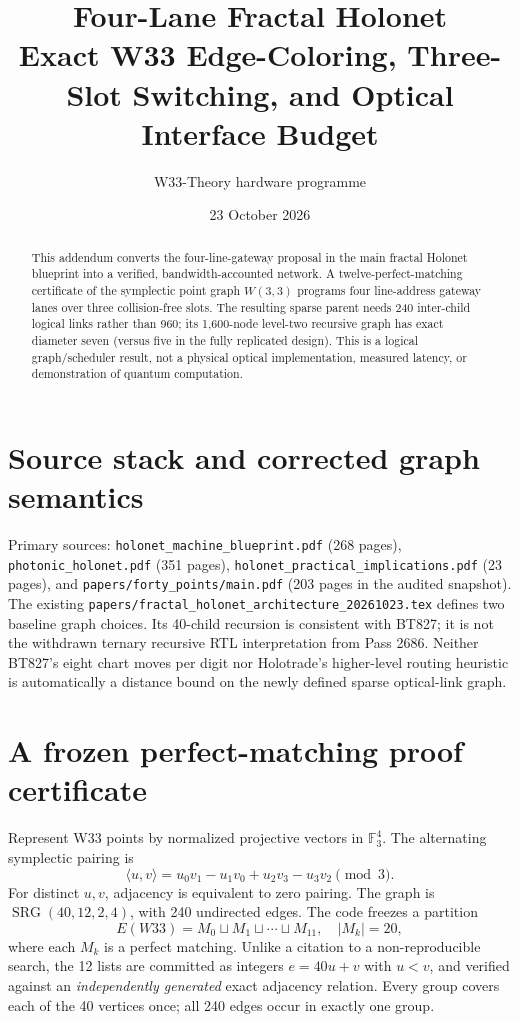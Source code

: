 \documentclass[10pt]{article}
\title{\textbf{Four-Lane Fractal Holonet}\\Exact W33 Edge-Coloring, Three-Slot Switching, and Optical Interface Budget}
\author{W33-Theory hardware programme}
\date{23 October 2026}
\begin{document}
\maketitle
\begin{abstract}
This addendum converts the four-line-gateway proposal in the main fractal Holonet blueprint into a verified, bandwidth-accounted network. A twelve-perfect-matching certificate of the symplectic point graph $W(3,3)$ programs four line-address gateway lanes over three collision-free slots. The resulting sparse parent needs 240 inter-child logical links rather than 960; its 1,600-node level-two recursive graph has exact diameter seven (versus five in the fully replicated design). This is a logical graph/scheduler result, not a physical optical implementation, measured latency, or demonstration of quantum computation.
\end{abstract}
\tableofcontents
\section{Source stack and corrected graph semantics}
Primary sources: \texttt{holonet\_machine\_blueprint.pdf} (268 pages),
\texttt{photonic\_holonet.pdf} (351 pages),
\texttt{holonet\_practical\_implications.pdf} (23 pages), and
\texttt{papers/forty\_points/main.pdf} (203 pages in the audited snapshot).
The existing \texttt{papers/fractal\_holonet\_architecture\_20261023.tex}
defines two baseline graph choices. Its 40-child recursion is consistent
with BT827; it is not the withdrawn ternary recursive RTL interpretation
from Pass 2686. Neither BT827's eight chart moves per digit nor
Holotrade's higher-level routing heuristic is automatically a
distance bound on the newly defined sparse optical-link graph.

\section{A frozen perfect-matching proof certificate}
Represent W33 points by normalized projective vectors in $\mathbb F_3^4$.
The alternating symplectic pairing is
\[
\langle u,v\rangle =u_0v_1-u_1v_0+u_2v_3-u_3v_2\pmod 3.
\]
For distinct $u,v$, adjacency is equivalent to zero pairing.
The graph is $\operatorname{SRG}(40,12,2,4)$, with 240 undirected edges.
The code freezes a partition
\[
E(W33)=M_0\sqcup M_1\sqcup\cdots\sqcup M_{11},
\quad |M_k|=20,
\]
where each $M_k$ is a perfect matching. Unlike a citation to a
non-reproducible search, the 12 lists are committed as integers
$e=40u+v$ with $u<v$, and verified against an \emph{independently
generated} exact adjacency relation. Every group covers each of the
40 vertices once; all 240 edges occur in exactly one group.
\end{document}

